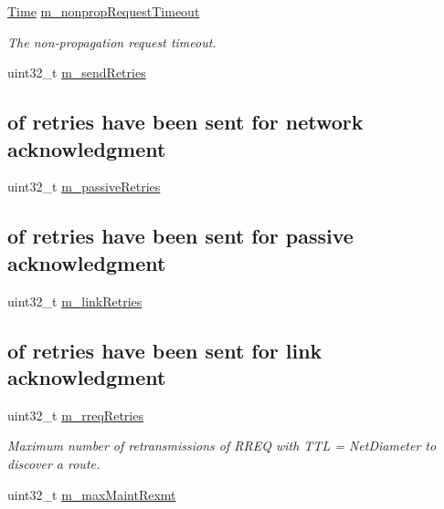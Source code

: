 \begin{DoxyCompactItemize}
\hyperlink{classns3_1_1Time}{Time} \hyperlink{classns3_1_1dsr_1_1DsrRouting_a42c2f43fbb0c5fefed36689eaf5c720e}{m\+\_\+nonprop\+Request\+Timeout}
\begin{DoxyCompactList}\small\item\em The non-\/propagation request timeout. \end{DoxyCompactList}\item 
uint32\+\_\+t \hyperlink{classns3_1_1dsr_1_1DsrRouting_a02a55fe3b490af4dbd62953065d293a3}{m\+\_\+send\+Retries}
\begin{DoxyCompactList}\small\item\em \subsection*{of retries have been sent for network acknowledgment}\end{DoxyCompactList}\item 
uint32\+\_\+t \hyperlink{classns3_1_1dsr_1_1DsrRouting_a88b8d65dce20b6b8f910be916623da0b}{m\+\_\+passive\+Retries}
\begin{DoxyCompactList}\small\item\em \subsection*{of retries have been sent for passive acknowledgment}\end{DoxyCompactList}\item 
uint32\+\_\+t \hyperlink{classns3_1_1dsr_1_1DsrRouting_a78b9a7405d3c905f57fa5aba63984d26}{m\+\_\+link\+Retries}
\begin{DoxyCompactList}\small\item\em \subsection*{of retries have been sent for link acknowledgment}\end{DoxyCompactList}\item 
uint32\+\_\+t \hyperlink{classns3_1_1dsr_1_1DsrRouting_a88bbff666cd3bb5bad099587a967d547}{m\+\_\+rreq\+Retries}
\begin{DoxyCompactList}\small\item\em Maximum number of retransmissions of R\+R\+EQ with T\+TL = Net\+Diameter to discover a route. \end{DoxyCompactList}\item 
uint32\+\_\+t \hyperlink{classns3_1_1dsr_1_1DsrRouting_aca44a3d45b57be61ec3e41774f20c1fb}{m\+\_\+max\+Maint\+Rexmt}

\end{DoxyCompactItemize}
